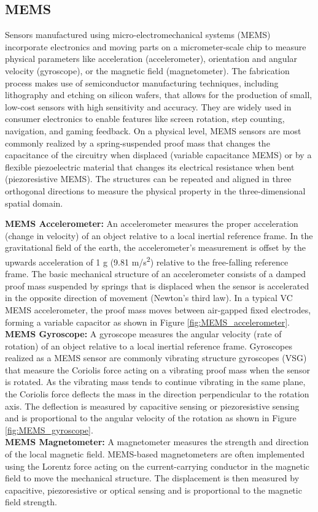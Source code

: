 \documentclass[sigconf, nonacm]{acmart}
\begin{document}
\subsection{MEMS}
\begin{sloppypar}
Sensors manufactured using micro-electromechanical systems (MEMS) incorporate electronics and moving parts on a micrometer-scale chip to measure physical parameters like acceleration (accelerometer), orientation and angular velocity (gyroscope), or the magnetic field (magnetometer).
The fabrication process makes use of semiconductor manufacturing techniques, including lithography and etching on silicon wafers, that allows for the production of small, low-cost sensors with high sensitivity and accuracy.
They are widely used in consumer electronics to enable features like screen rotation, step counting, navigation, and gaming feedback.
On a physical level, MEMS sensors are most commonly realized by a spring-suspended proof mass that changes the capacitance of the circuitry when displaced (variable capacitance MEMS) or by a flexible piezoelectric material that changes its electrical resistance when bent (piezoresistive MEMS).
The structures can be repeated and aligned in three orthogonal directions to measure the physical property in the three-dimensional spatial domain.
\vspace{0.25cm}
\end{sloppypar}
\noindent
\textbf{MEMS Accelerometer:} An accelerometer measures the proper acceleration (change in velocity) of an object relative to a local inertial reference frame.
In the gravitational field of the earth, the accelerometer's measurement is offset by the upwards acceleration of 1 g (9.81 m/s\textsuperscript{2}) relative to the free-falling reference frame.
The basic mechanical structure of an accelerometer consists of a damped proof mass suspended by springs that is displaced when the sensor is accelerated in the opposite direction of movement (Newton's third law).
In a typical VC MEMS accelerometer, the proof mass moves between air-gapped fixed electrodes, forming a variable capacitor as shown in Figure \ref{fig:MEMS_accelerometer}.
\\[6pt]
\textbf{MEMS Gyroscope:} A gyroscope measures the angular velocity (rate of rotation) of an object relative to a local inertial reference frame.
Gyroscopes realized as a MEMS sensor are commonly vibrating structure gyroscopes (VSG) that measure the Coriolis force acting on a vibrating proof mass when the sensor is rotated.
As the vibrating mass tends to continue vibrating in the same plane, the Coriolis force deflects the mass in the direction perpendicular to the rotation axis.
The deflection is measured by capacitive sensing or piezoresistive sensing and is proportional to the angular velocity of the rotation as shown in Figure \ref{fig:MEMS_gyroscope}.
\\[6pt]
\textbf{MEMS Magnetometer:} A magnetometer measures the strength and direction of the local magnetic field.
MEMS-based magnetometers are often implemented using the Lorentz force acting on the current-carrying conductor in the magnetic field to move the mechanical structure.
The displacement is then measured by capacitive, piezoresistive or optical sensing and is proportional to the magnetic field strength.
\end{document}
